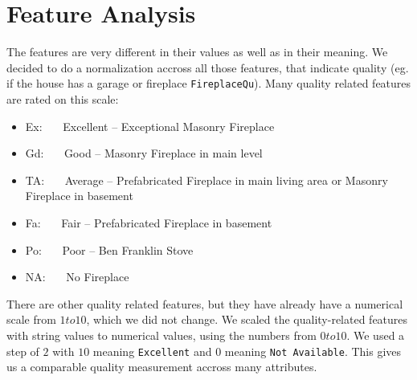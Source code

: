 \section{Feature Analysis}

The features are very different in their values as well as in their meaning. We decided to do a normalization accross all those features, that indicate quality (eg. if the house has a garage or fireplace \texttt{FireplaceQu}). Many quality related features are rated on this scale:

\begin{itemize}
    \item Ex:~~~ Excellent -- Exceptional Masonry Fireplace
    \item Gd:~~~ Good -- Masonry Fireplace in main level
    \item TA:~~~ Average -- Prefabricated Fireplace in main living area or Masonry Fireplace in basement
    \item Fa:~~~ Fair -- Prefabricated Fireplace in basement
    \item Po:~~~ Poor -- Ben Franklin Stove
    \item NA:~~~ No Fireplace
\end{itemize}

There are other quality related features, but they have already have a numerical scale from $1 to 10$, which we did not change. We scaled the quality-related features with string values to numerical values, using the numbers from $0 to 10$. We used a step of $2$ with $10$ meaning \texttt{Excellent} and $0$ meaning \texttt{Not Available}. This gives us a comparable quality measurement accross many attributes.